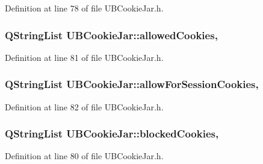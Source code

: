 Definition at line 78 of file U\-B\-Cookie\-Jar.\-h.

\hypertarget{class_u_b_cookie_jar_ad87bcda47828dbca15535bcbb01d17e8}{
\subsubsection[{allowed\-Cookies}]{\setlength{\rightskip}{0pt plus 5cm}Q\-String\-List U\-B\-Cookie\-Jar\-::allowed\-Cookies\hspace{0.3cm}{\ttfamily [read]}, {\ttfamily [write]}}}\label{dd/d20/class_u_b_cookie_jar_ad87bcda47828dbca15535bcbb01d17e8}


Definition at line 81 of file U\-B\-Cookie\-Jar.\-h.

\hypertarget{class_u_b_cookie_jar_adb923c38e38411c8cb1ae9d87ada66f2}{
\subsubsection[{allow\-For\-Session\-Cookies}]{\setlength{\rightskip}{0pt plus 5cm}Q\-String\-List U\-B\-Cookie\-Jar\-::allow\-For\-Session\-Cookies\hspace{0.3cm}{\ttfamily [read]}, {\ttfamily [write]}}}\label{dd/d20/class_u_b_cookie_jar_adb923c38e38411c8cb1ae9d87ada66f2}


Definition at line 82 of file U\-B\-Cookie\-Jar.\-h.

\hypertarget{class_u_b_cookie_jar_ac3cce1bd05d14c83b8f14c7220229679}{
\subsubsection[{blocked\-Cookies}]{\setlength{\rightskip}{0pt plus 5cm}Q\-String\-List U\-B\-Cookie\-Jar\-::blocked\-Cookies\hspace{0.3cm}{\ttfamily [read]}, {\ttfamily [write]}}}\label{dd/d20/class_u_b_cookie_jar_ac3cce1bd05d14c83b8f14c7220229679}


Definition at line 80 of file U\-B\-Cookie\-Jar.\-h.

